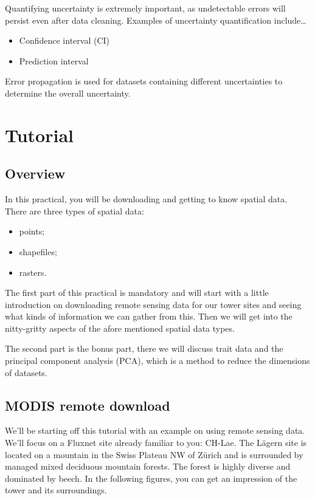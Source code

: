 \documentclass[
]{book}
\providecommand{\tightlist}{%
  \setlength{\itemsep}{0pt}\setlength{\parskip}{0pt}}
\begin{document}
Quantifying uncertainty is extremely important, as undetectable errors will persist even after data cleaning. Examples of uncertainty quantification include\ldots{}

\begin{itemize}
\tightlist
\item
  Confidence interval (CI)
\item
  Prediction interval
\end{itemize}

Error propagation is used for datasets containing different uncertainties to determine the overall uncertainty.

\hypertarget{tutorial}{%
\section{Tutorial}\label{tutorial}}

\hypertarget{overview-1}{%
\subsection{Overview}\label{overview-1}}

In this practical, you will be downloading and getting to know spatial data. There are three types of spatial data:

\begin{itemize}
\tightlist
\item
  points;
\item
  shapefiles;
\item
  rasters.
\end{itemize}

The first part of this practical is mandatory and will start with a little introduction on downloading remote sensing data for our tower sites and seeing what kinds of information we can gather from this. Then we will get into the nitty-gritty aspects of the afore mentioned spatial data types.

The second part is the bonus part, there we will discuss trait data and the principal component analysis (PCA), which is a method to reduce the dimensions of datasets.

\hypertarget{modis-remote-download}{%
\subsection{MODIS remote download}\label{modis-remote-download}}

We'll be starting off this tutorial with an example on using remote sensing data. We'll focus on a Fluxnet site already familiar to you: CH-Lae. The Lägern site is located on a mountain in the Swiss Plateau NW of Zürich and is surrounded by managed mixed deciduous mountain forests. The forest is highly diverse and dominated by beech. In the following figures, you can get an impression of the tower and its surroundings.
\end{document}
